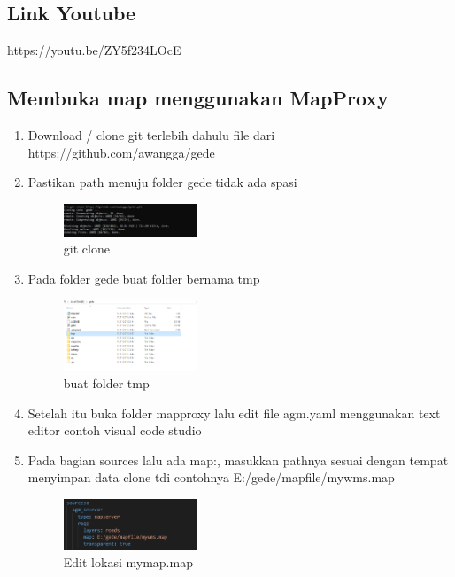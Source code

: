 \subsection{Link Youtube}
https://youtu.be/ZY5f234LOcE

\subsection{Membuka map menggunakan MapProxy}
\begin{enumerate}
  \item Download / clone git terlebih dahulu file dari https://github.com/awangga/gede
  \item Pastikan path menuju folder gede tidak ada spasi 
  \hfill\break
  \begin{figure}[H]
  \includegraphics[width=4cm]{figures/Tugas4/1174087/12.png}
  \centering
  \caption{git clone}
  \end{figure}
  
  \item Pada folder gede buat folder bernama tmp
  \hfill\break
  \begin{figure}[H]
  \includegraphics[width=4cm]{figures/Tugas4/1174087/13.png}
  \centering
  \caption{buat folder tmp}
  \end{figure}
 
  \item Setelah itu buka folder mapproxy lalu edit file agm.yaml menggunakan text editor contoh visual code studio
  \item Pada bagian sources lalu ada map:, masukkan pathnya sesuai dengan tempat menyimpan data clone tdi contohnya E:/gede/mapfile/mywms.map
  \hfill\break
  \begin{figure}[H]
  \includegraphics[width=4cm]{figures/Tugas4/1174087/14.png}
  \centering
  \caption{Edit lokasi mymap.map}
  \end{figure}



\end{enumerate}
